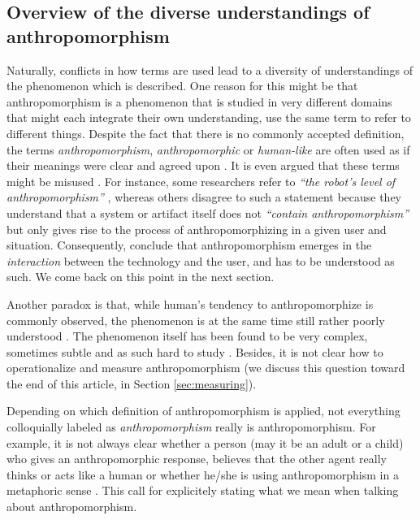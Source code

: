 \documentclass{frontiersSCNS} %
\newcommand{\eg}{{\textit{e.g.~}}}
\begin{document}

\subsection{Overview of the diverse understandings of anthropomorphism}

Naturally, conflicts in how terms are used lead to a diversity of understandings
of the phenomenon which is described.  One reason for this might be that
anthropomorphism is a phenomenon that is studied in very different domains that
might each integrate their own understanding, use the same term to refer to
different things.  Despite the fact that there is no commonly accepted
definition, the terms \textit{anthropomorphism}, \textit{anthropomorphic} or
\textit{human-like} are often used as if their meanings were clear and agreed
upon \citep{persson_anthropomorphism_2000}. It is even argued that these terms
might be misused \citep{duffy_anthropomorphism_2002,epley_when_2008}.  For
instance, some researchers refer to \textit{``the robot's level of
anthropomorphism''} \citep{bartneck_is_2007,feil-seifer_human-robot_2008}, whereas others disagree to such a
statement because they understand that a system or artifact itself does not
\textit{``contain anthropomorphism''} but only gives rise to the process of
anthropomorphizing in a given user and situation. Consequently,
\cite{persson_anthropomorphism_2000} conclude that anthropomorphism emerges in
the \textit{interaction} between the technology and the user, and has to be
understood as such. We come back on this point in the next section.


Another paradox is that, while human's tendency to anthropomorphize is commonly
observed, the phenomenon is at the same time still rather poorly understood
\citep{epley_seeing_2007}. The phenomenon itself has been found to be very
complex, sometimes subtle and as such hard to study
\citep{duffy_anthropomorphism_2002,epley_when_2008}. Besides, it is not clear
how to operationalize and measure anthropomorphism (we discuss this question
toward the end of this article, in Section \ref{sec:measuring}).

Depending on which definition of anthropomorphism is applied, not everything 
colloquially labeled as \emph{anthropomorphism} really is anthropomorphism.
For example, it is not always clear whether a person (may it be an adult or 
a child) who gives an anthropomorphic response, believes that the other agent really 
thinks or acts like a human or whether he/she is using anthropomorphism in a metaphoric 
sense \citep{leeds_childrens_1992}.
This call for explicitely stating what we mean when talking about anthropomorphism. 
\end{document}

